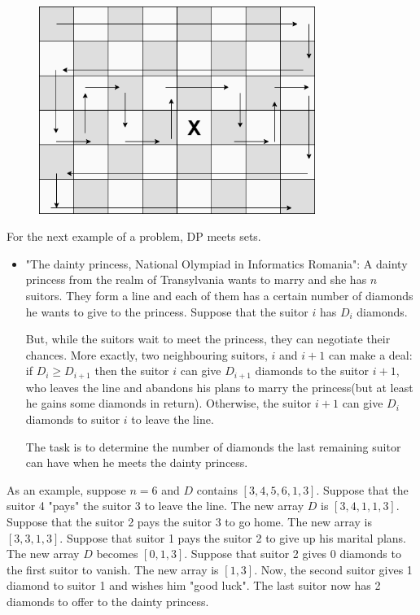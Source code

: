 \documentclass[letterpaper]{article}
\begin{document}
\begin{figure} [h!]
\centering
\includegraphics[width=0.8\textwidth]{pngOfDiagrams/gamesandpaths9.png}
\end{figure}

For the next example of a problem, DP meets sets.

\begin{itemize}
    \item "The dainty princess, National Olympiad in Informatics Romania": A dainty princess from the realm of Transylvania wants to marry and she has $n$ suitors. They form a line and each of them has a certain number of diamonds he wants to give to the princess. Suppose that the suitor $i$ has $D_i$ diamonds.

    But, while the suitors wait to meet the princess, they can negotiate their chances. More exactly, two neighbouring suitors, $i$ and $i + 1$ can make a deal: if $D_i \geq D_{i + 1}$ then the suitor $i$ can give $D_{i + 1}$ diamonds to the suitor $i + 1$, who leaves the line and abandons his plans to marry the princess(but at least he gains some diamonds in return). Otherwise, the suitor $i + 1$ can give $D_i$ diamonds to suitor $i$ to leave the line.

    The task is to determine the number of diamonds the last remaining suitor can have when he meets the dainty princess.
\end{itemize}

As an example, suppose $n = 6$ and $D$ contains $[3,4,5,6,1,3]$. Suppose that the suitor 4 "pays" the suitor 3 to leave the line. The new array $D$ is $[3,4,1,1,3]$. Suppose that the suitor 2 pays the suitor 3 to go home. The new array is $[3,3,1,3]$. Suppose that suitor 1 pays the suitor 2 to give up his marital plans. The new array $D$ becomes $[0, 1,3]$. Suppose that suitor 2 gives 0 diamonds to the first suitor to vanish. The new array is $[1,3]$. Now, the second suitor gives 1 diamond to suitor 1 and wishes him "good luck". The last suitor now has 2 diamonds to offer to the dainty princess.
\end{document}

